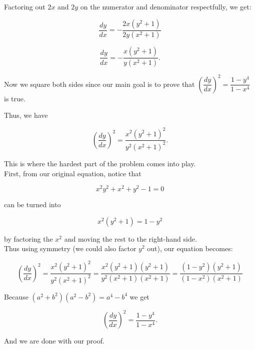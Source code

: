 \documentclass{article}
\begin{document}
Factoring out $2x$ and $2y$ on the numerator and denominator respectfully, we get:

    \[ \dfrac {dy} {dx} = -\dfrac {2x \left( y^{2} + 1 \right)} {2y \left( x^{2} + 1 \right)} \]
    
    \[ \dfrac {dy} {dx} = -\dfrac {x \left( y^{2} + 1 \right)} {y \left( x^{2} + 1 \right)}. \]

Now we square both sides since our main goal is to prove that $\left( \dfrac {dy} {dx} \right)^{2} = \dfrac {1 - y^4} {1 - x^4}$ is true.

    Thus, we have

    \[ \left( \dfrac {dy} {dx} \right)^{2} = \dfrac {x^2 \left( y^{2} + 1 \right)^{2}} {y^2 \left( x^{2} + 1 \right)^{2}}. \]

This is where the hardest part of the problem comes into play.\\
First, from our original equation, notice that

\[x^{2}y^{2} + x^{2} + y^{2} - 1 = 0\]

can be turned into

\[x^{2} \left( y^2 + 1 \right) = 1 - y^2\]

by factoring the $x^2$ and moving the rest to the right-hand side.\\

Thus using symmetry (we could also factor $y^2$ out), our equation becomes:

    \[ \left( \dfrac {dy} {dx} \right)^{2} = \dfrac {x^2 \left( y^{2} + 1 \right)^{2}} {y^2 \left( x^{2} + 1 \right)^{2}} = \dfrac {x^2 \left( y^{2} + 1 \right)\left( y^{2} + 1 \right)} {y^2 \left( x^{2} + 1 \right)\left( x^{2} + 1 \right)} = \dfrac {\left( 1 - y^2 \right) \left( 
y^2 + 1 \right)} {\left( 1 - x^2 \right) \left( 
x^2 + 1 \right)} \]

Because $\left( a^2 + b^2 \right) \left( a^2 - b^2 \right) = a^4 - b^4$ we get

    \[ \left( \dfrac {dy} {dx} \right)^{2} = \dfrac {1 - y^4} {1 - x^4}. \]

And we are done with our proof.
\end{document}

